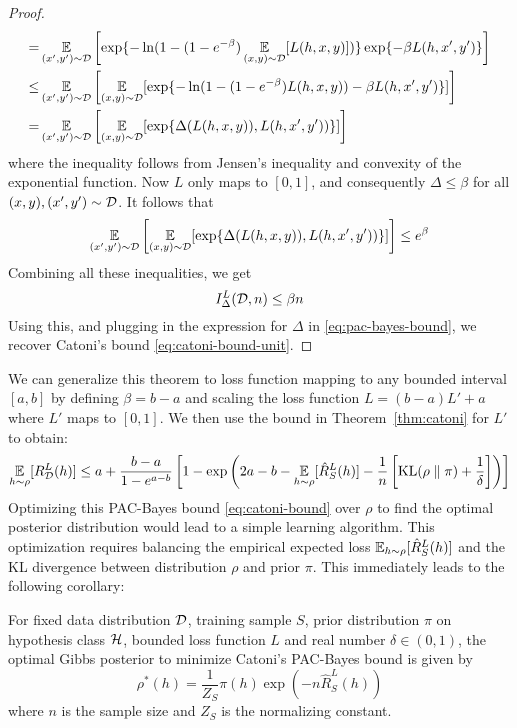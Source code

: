 \begin{proof}
\begin{equation}
\begin{split}
      =& \operatorname*{\mathbb{E}}_{(x', y') \sim \mathcal{D}}\left[\exp\{- \ln(1 - (1 - e^{-\beta}) \operatorname*{\mathbb{E}}_{(x,
      y) \sim \mathcal{D}}[L(h, x, y)])\} \exp\{-\beta L(h, x', y')\}\right] \\
      \leq& \operatorname*{\mathbb{E}}_{(x', y') \sim \mathcal{D}}\left[\operatorname*{\mathbb{E}}_{(x, y) \sim \mathcal{D}}[\exp\{- \ln(1 -
      (1 - e^{-\beta}) L(h, x, y)) - \beta L(h, x', y')\}]\right] \\
      =& \operatorname*{\mathbb{E}}_{(x', y') \sim \mathcal{D}}\left[\operatorname*{\mathbb{E}}_{(x, y) \sim \mathcal{D}}[\exp\{\Delta(L(h, x,
      y)), L(h, x', y'))\}]\right]
    \end{split}
  \end{equation}
  where the inequality follows from Jensen's inequality and convexity of the
  exponential function. Now $L$ only maps to $[0, 1]$, and consequently $\Delta
  \leq \beta$ for all $(x, y), (x', y') \sim \mathcal{D}$. It follows that
  \begin{equation}
      \operatorname*{\mathbb{E}}_{(x', y') \sim \mathcal{D}}\left[\operatorname*{\mathbb{E}}_{(x, y) \sim \mathcal{D}}[\exp\{\Delta(L(h, x,
      y)), L(h, x', y'))\}]\right] \leq e^\beta
  \end{equation}
  Combining all these inequalities, we get
  \begin{equation}
    I_\Delta^L(\mathcal{D}, n) \leq \beta n
  \end{equation}
  Using this, and plugging in the expression for $\Delta$ in
  \eqref{eq:pac-bayes-bound}, we recover Catoni's bound
  \eqref{eq:catoni-bound-unit}.
\end{proof}

We can generalize this theorem to loss function mapping to any bounded interval
$[a, b]$ by defining $\beta = b - a$ and scaling the loss function $L = (b - a)
L' + a$ where $L'$ maps to $[0, 1]$. We then use the bound in
Theorem~\ref{thm:catoni} for $L'$ to obtain:
\begin{equation}
  \label{eq:catoni-bound}
  \operatorname*{\mathbb{E}}_{h \sim \rho}[R_{\mathcal{D}}^L(h)] \leq a + \frac{b - a}{1 - e^{a - b}} \left[1 -
  \exp\left(2 a - b - \operatorname*{\mathbb{E}}_{h \sim \rho}[\hat{R}_S^L(h)] - \frac{1}{n}
  \left[\text{KL}(\rho \parallel \pi) + \frac{1}{\delta}\right]\right)\right]
\end{equation}
Optimizing this PAC-Bayes bound \eqref{eq:catoni-bound} over $\rho$ to find
the optimal posterior distribution would lead to a simple learning algorithm.
This optimization requires balancing the empirical expected loss $\operatorname*{\mathbb{E}}_{h \sim
\rho}[\hat{R}_S^L(h)]$ and the KL divergence between distribution $\rho$ and
prior $\pi$. This immediately leads to the following corollary:

\begin{corollary}
  \label{cor:gibbs}
  For fixed data distribution $\mathcal{D}$, training sample $S$, prior distribution
  $\pi$ on hypothesis class $\mathcal{H}$, bounded loss function $L$ and real number
  $\delta \in (0, 1)$, the optimal Gibbs posterior to minimize Catoni's
  PAC-Bayes bound is given by
  \begin{equation}
    \rho^*(h) = \frac{1}{Z_S} \pi(h) \exp(-n \hat{R}_S^L(h))
  \end{equation}
  where $n$ is the sample size and $Z_S$ is the normalizing constant.
\end{corollary}

